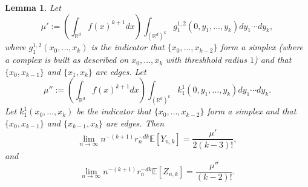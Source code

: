 \documentclass{amsart}
\newtheorem{lemma}[thm]{Lemma}
\theoremstyle{definition}
\newcommand{\R}{\mathbb{R}}
\newcommand{\E}{\mathbb{E}}
\renewcommand{\1}{\mathbb{1}}
\begin{document}
\begin{comment}
h_{r_n}(x_1,
\ldots,x_k)f(x_1)\left(\prod_{i=2}^kf(x_i)-f(x_1)^{k-1}\right)d(x_1,\ldots,
x_k)\right|\\&\le  C \int_{\R^d}\left[\frac{1}{
\left[(2r_n)^{d}\theta_d\right]^{k-1}}
\int_{B_{2r_n}(x_1)^{k-1}}\left|\prod_{i=2}^kf(x_i)-f(x_1)^{k-1}\right|
d(x_2,\ldots,x_k)\right]f(x_1)dx_1,
\end{split}\end{equation*}
where $$C=\frac{2^{d(k-1)}\theta_d^{k-1}}{k!}.$$
From this last expression, it follows from the dominated convergence theorem
 that if $f$ is continuous at $x_1$, then the inner integral over 
$(x_2,\ldots,x_k)$ tends to zero as $n$ tends to infinity, for $d$ and $k$ 
fixed.  In fact, the following inductive argument shows that $x_1$ only
needs to be a Lebesgue point of $f$; that is, it suffices that
$$\lim_{r\downarrow 0}\left(r^{-d}\int_{B_r(x_1)}|f(y)-f(x)|dy\right)=0.$$
If $k=2$, that it suffices for $x_1$ to be a Lebesgue point of $f$
is obvious.  For $k>2$, bound the integrand above by 
\begin{equation*}\begin{split}|f(x_k)-f(x_1)|\prod_{i=2}^{k-1}f(x_i)&+
f(x_1)\left|\prod_{i=2}^{k-1}f(x_i)-f(x_1)^{k-2}\right|\\&\le
|f(x_k)-f(x_1)|\|f\|_\infty^{k-2}+f(x_1)\left|\prod_{i=2}^{k-1}
f(x_i)-f(x_1)^{k-2}\right|.\end{split}\end{equation*}
Now, $\frac{1}{(2r_n)^d}\int_{B_{2r_n}(x_1)}|f(x_k)-f(x_1)|dx_k\xrightarrow{n
\to\infty}0$ by definition of a Lebesgue point, and 
$$\frac{1}{(2r_n)^{d(k-2)}}\int_{(B_{2r_n}(x_1))^{k-2}}\left|\prod_{i=2}^{k-1}
f(x_i)-f(x_1)^{k-2}\right|d(x_2,\ldots,x_{k-1})\xrightarrow{n
\to\infty}0$$ by induction hypothesis.
Since almost every point of $\R^d$ is a Lebesgue point of $f$, it now follows
by the dominated convergence theorem that $n^{-k}r_n^{-d(k-1)}I_2\to0$ as
$n\to\infty$.


\end{proof}
\end{comment}



\begin{lemma}\label{exp-upper}
Let $$\mu':=\left(\int_{\R^d}f(x)^{k+1}dx\right)\int_{(\R^d)^k}
g_1^{1,2}(0,y_1,\ldots,y_k)dy_1\cdots d y_k,$$
where $g_1^{1,2}(x_0,\ldots,x_k)$ is the indicator that 
$\{x_0,\ldots,x_{k-2}\}$ form a simplex (where a
  complex is built as described on $x_0,\ldots,x_{k}$ with
  threshhold radius $1$) and that $\{x_0,x_{k-1}\}$ and
  $\{x_1,x_{k}\}$ are edges.  
Let $$\mu'':=\left(\int_{\R^d}f(x)^{k+1}dx\right)\int_{(\R^d)^k}
k_1^{1}(0,y_1,\ldots,y_k)dy_1\cdots d y_k.$$
Let $k^{1}_{1}(x_0,\ldots,x_{k})$
  be the indicator that $\{x_0,\ldots,x_{k-2}\}$ form a simplex and
  that $\{x_0,x_{k-1}\}$ and $\{x_{k-1},x_{k}\}$ are edges.
Then 
$$\lim_{n\to\infty}n^{-(k+1)}r_n^{-dk}\E[Y_{n,k}]=\frac{\mu'}{2(k-3)!},$$
and 
$$\lim_{n\to\infty}n^{-(k+1)}r_n^{-dk}\E[Z_{n,k}]=\frac{\mu''}{(k-2)!}.$$
\end{lemma}
\end{document}
